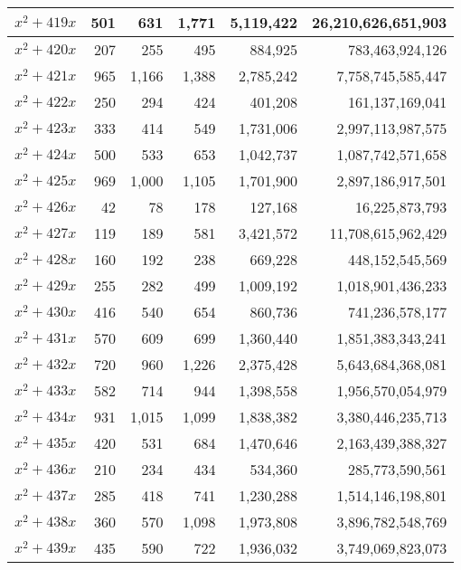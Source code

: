 \documentclass[a4paper]{amsproc}
\theoremstyle{plain}
\theoremstyle{named}
\begin{document}
\begin{longtable}{ | l | r | r | r | r | r | }
$x^2 + 419x$ & 501 & 631 & 1{,}771 & 5{,}119{,}422 & 26{,}210{,}626{,}651{,}903 \\ \hline
$x^2 + 420x$ & 207 & 255 & 495 & 884{,}925 & 783{,}463{,}924{,}126 \\ \hline
$x^2 + 421x$ & 965 & 1{,}166 & 1{,}388 & 2{,}785{,}242 & 7{,}758{,}745{,}585{,}447 \\ \hline
$x^2 + 422x$ & 250 & 294 & 424 & 401{,}208 & 161{,}137{,}169{,}041 \\ \hline
$x^2 + 423x$ & 333 & 414 & 549 & 1{,}731{,}006 & 2{,}997{,}113{,}987{,}575 \\ \hline
$x^2 + 424x$ & 500 & 533 & 653 & 1{,}042{,}737 & 1{,}087{,}742{,}571{,}658 \\ \hline
$x^2 + 425x$ & 969 & 1{,}000 & 1{,}105 & 1{,}701{,}900 & 2{,}897{,}186{,}917{,}501 \\ \hline
$x^2 + 426x$ & 42 & 78 & 178 & 127{,}168 & 16{,}225{,}873{,}793 \\ \hline
$x^2 + 427x$ & 119 & 189 & 581 & 3{,}421{,}572 & 11{,}708{,}615{,}962{,}429 \\ \hline
$x^2 + 428x$ & 160 & 192 & 238 & 669{,}228 & 448{,}152{,}545{,}569 \\ \hline
$x^2 + 429x$ & 255 & 282 & 499 & 1{,}009{,}192 & 1{,}018{,}901{,}436{,}233 \\ \hline
$x^2 + 430x$ & 416 & 540 & 654 & 860{,}736 & 741{,}236{,}578{,}177 \\ \hline
$x^2 + 431x$ & 570 & 609 & 699 & 1{,}360{,}440 & 1{,}851{,}383{,}343{,}241 \\ \hline
$x^2 + 432x$ & 720 & 960 & 1{,}226 & 2{,}375{,}428 & 5{,}643{,}684{,}368{,}081 \\ \hline
$x^2 + 433x$ & 582 & 714 & 944 & 1{,}398{,}558 & 1{,}956{,}570{,}054{,}979 \\ \hline
$x^2 + 434x$ & 931 & 1{,}015 & 1{,}099 & 1{,}838{,}382 & 3{,}380{,}446{,}235{,}713 \\ \hline
$x^2 + 435x$ & 420 & 531 & 684 & 1{,}470{,}646 & 2{,}163{,}439{,}388{,}327 \\ \hline
$x^2 + 436x$ & 210 & 234 & 434 & 534{,}360 & 285{,}773{,}590{,}561 \\ \hline
$x^2 + 437x$ & 285 & 418 & 741 & 1{,}230{,}288 & 1{,}514{,}146{,}198{,}801 \\ \hline
$x^2 + 438x$ & 360 & 570 & 1{,}098 & 1{,}973{,}808 & 3{,}896{,}782{,}548{,}769 \\ \hline
$x^2 + 439x$ & 435 & 590 & 722 & 1{,}936{,}032 & 3{,}749{,}069{,}823{,}073 \\ \hline

\end{longtable}
\end{document}
